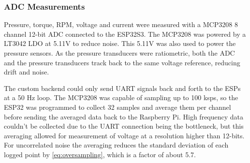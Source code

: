 

\subsubsection{ADC Measurements}

Pressure, torque, RPM, voltage and current were measured with a MCP3208 8 channel 12-bit ADC connected to the ESP32S3. The MCP3208 was powered by a LT3042 LDO at 5.11V to reduce noise. This 5.11V was also used to power the pressure sensors. As the pressure transducers were ratiometric, both the ADC and the pressure transducers track back to the same voltage reference, reducing drift and noise.

The custom backend could only send UART signals back and forth to the ESPs at a 50 Hz loop. The MCP3208 was capable of sampling up to 100 ksps, so the ESP32 was programmed to collect 32 samples and average them per channel before sending the averaged data back to the Raspberry Pi. High frequency data couldn't be collected due to the UART connection being the bottleneck, but this averaging allowed for measurement of voltage at a resolution higher than 12-bits. For uncorrelated noise the averaging reduces the standard deviation of each logged point by \cref{eq:oversampling}, which is a factor of about 5.7.


